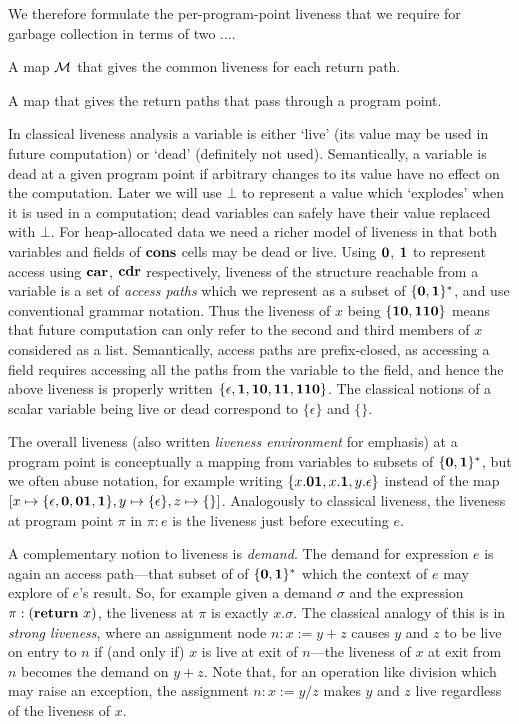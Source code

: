 We therefore  formulate the per-program-point  liveness that
we require for garbage collection in terms of two ....

A  map $\cal{M}$  that gives  the common  liveness  for each
return path.

A  map that  gives  the  return paths  that  pass through  a
program point.

 

In classical liveness analysis a  variable is either `live' (its value
may be  used in future  computation) or `dead' (definitely  not used).
Semantically, a variable is dead at a given program point if arbitrary
changes to its value have no effect on the computation.  Later we will
use $\bot$ to represent a value  which `explodes' when it is used in a
computation; dead variables can  safely have their value replaced with
$\bot$.  For heap-allocated data we need a richer model of liveness in
that both variables  and fields of $\mbox{$\mathbf{cons}$}$ cells may  be dead or live.
Using  $\mathbf{0}$,  $\mathbf{1}$  to  represent access  using  $\mbox{$\mathbf{car}$}$,  $\mbox{$\mathbf{cdr}$}$
respectively, liveness of the structure reachable from a variable is a
set  of  {\em  access  paths}  which  we  represent  as  a  subset  of
$\{\mathbf{0},\mathbf{1}\}^\ast$, and  use conventional grammar  notation.  Thus
the liveness of $x$ being $\{\mathbf{1}\mathbf{0}, \mathbf{1}\mathbf{1}\mathbf{0}\}$ means that
future computation can  only refer to the second  and third members of
$x$   considered  as   a   list.   Semantically,   access  paths   are
prefix-closed, as  accessing a field requires accessing  all the paths
from  the variable  to  the field,  and  hence the  above liveness  is
properly   written   $\{\epsilon,   \mathbf{1},   \mathbf{1}\mathbf{0},   \mathbf{1}\mathbf{1},
\mathbf{1}\mathbf{1}\mathbf{0}\}$.  The classical notions  of a scalar variable being
live or dead correspond to $\{\epsilon\}$ and $\{\}$.

The  overall liveness  (also  written {\em  liveness environment}  for
emphasis) at a program point  is conceptually a mapping from variables
to subsets of $\{\mathbf{0},\mathbf{1}\}^\ast$, but we often abuse notation, for
example writing $\{x.\mathbf{0}\mathbf{1}, x.\mathbf{1}, y.\epsilon\}$ instead of the
map           $[x          \mapsto\{\epsilon,\mathbf{0},\mathbf{0}\mathbf{1},\mathbf{1}\},
  y\mapsto\{\epsilon\},  z\mapsto\{\}]$.    Analogously  to  classical
liveness,  the liveness  at  program  point $\pi$  in  $\pi:e$ is  the
liveness just before executing $e$.

A complementary notion to liveness is {\em demand}.  The demand for
expression $e$ is again an access path---that subset of of $\{\mathbf{0},\mathbf{1}\}^\ast$ which the
context of $e$ may explore of $e$'s result.  So, for example given a
demand $\sigma$ and the expression $\pi: (\mbox{$\mathbf{ return}$}\ x)$, the liveness at
$\pi$ is exactly $x.\sigma$.
The classical analogy of this is in {\em strong liveness}, where
an assignment node $n: x:=y+z$ causes $y$ and $z$ to be live on entry
to $n$ if (and only if) $x$ is live at exit of $n$---the liveness
of $x$ at exit from $n$ becomes the demand on $y+z$.
Note that, for an operation like division which
may raise an exception, the assignment $n: x:=y/z$ makes $y$ and $z$ live
regardless of the liveness of $x$.

